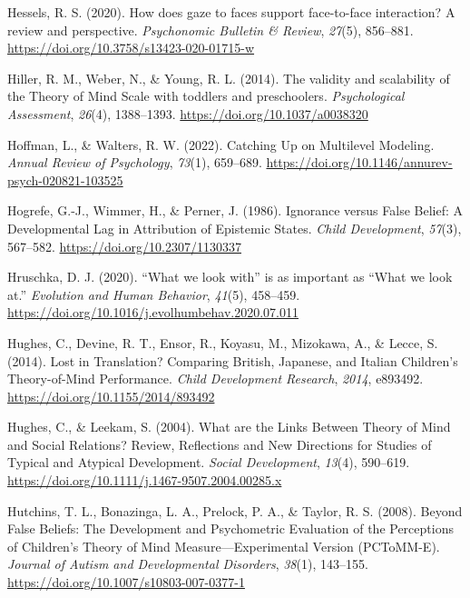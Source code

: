 \documentclass[
]{scrbook}
\newlength{\cslhangindent}
\newenvironment{CSLReferences}[2] %
 {\begin{list}{}{%
  \setlength{\itemindent}{0pt}
  \setlength{\leftmargin}{0pt}
  \setlength{\parsep}{0pt}
  \ifodd #1
   \setlength{\leftmargin}{\cslhangindent}
   \setlength{\itemindent}{-1\cslhangindent}
  \fi
  \setlength{\itemsep}{#2\baselineskip}}}
 {\end{list}}
\begin{document}
\begin{CSLReferences}{1}{0}
Hessels, R. S. (2020). How does gaze to faces support face-to-face interaction? {A} review and perspective. \emph{Psychonomic Bulletin \& Review}, \emph{27}(5), 856--881. \url{https://doi.org/10.3758/s13423-020-01715-w}

Hiller, R. M., Weber, N., \& Young, R. L. (2014). The validity and scalability of the {Theory} of {Mind Scale} with toddlers and preschoolers. \emph{Psychological Assessment}, \emph{26}(4), 1388--1393. \url{https://doi.org/10.1037/a0038320}

Hoffman, L., \& Walters, R. W. (2022). Catching {Up} on {Multilevel Modeling}. \emph{Annual Review of Psychology}, \emph{73}(1), 659--689. \url{https://doi.org/10.1146/annurev-psych-020821-103525}

Hogrefe, G.-J., Wimmer, H., \& Perner, J. (1986). Ignorance versus {False Belief}: {A Developmental Lag} in {Attribution} of {Epistemic States}. \emph{Child Development}, \emph{57}(3), 567--582. \url{https://doi.org/10.2307/1130337}

Hruschka, D. J. (2020). {``{What} we look with''} is as important as {``{What} we look at.''} \emph{Evolution and Human Behavior}, \emph{41}(5), 458--459. \url{https://doi.org/10.1016/j.evolhumbehav.2020.07.011}

Hughes, C., Devine, R. T., Ensor, R., Koyasu, M., Mizokawa, A., \& Lecce, S. (2014). Lost in {Translation}? {Comparing British}, {Japanese}, and {Italian Children}'s {Theory-of-Mind Performance}. \emph{Child Development Research}, \emph{2014}, e893492. \url{https://doi.org/10.1155/2014/893492}

Hughes, C., \& Leekam, S. (2004). What are the {Links Between Theory} of {Mind} and {Social Relations}? {Review}, {Reflections} and {New Directions} for {Studies} of {Typical} and {Atypical Development}. \emph{Social Development}, \emph{13}(4), 590--619. \url{https://doi.org/10.1111/j.1467-9507.2004.00285.x}

Hutchins, T. L., Bonazinga, L. A., Prelock, P. A., \& Taylor, R. S. (2008). Beyond {False Beliefs}: {The Development} and {Psychometric Evaluation} of the {Perceptions} of {Children}'s {Theory} of {Mind Measure}---{Experimental Version} ({PCToMM-E}). \emph{Journal of Autism and Developmental Disorders}, \emph{38}(1), 143--155. \url{https://doi.org/10.1007/s10803-007-0377-1}


\end{CSLReferences}
\end{document}
